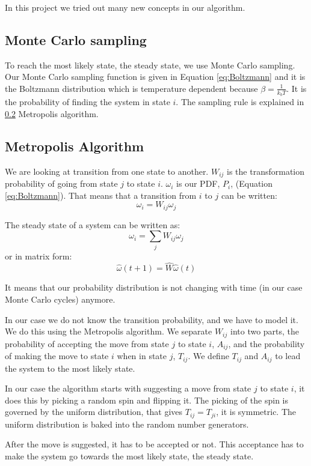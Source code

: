 In this project we tried out many new concepts in our algorithm.


\subsection{Monte Carlo sampling}

To reach the most likely state, the steady state, we use Monte Carlo sampling. Our Monte Carlo sampling function is given in Equation \ref{eq:Boltzmann} and it is the Boltzmann distribution which is temperature dependent because $\beta = \frac{1}{k_b T}$. It is the probability of finding the system in state $i$. The sampling rule is explained in \ref{sec:metropolis} Metropolis algorithm.

\subsection{Metropolis Algorithm}\label{sec:metropolis}

We are looking at transition from one state to another. $W_{ij}$ is the transformation probability of going from state $j$ to state $i$. $\omega_i$ is our PDF, $P_i$, (Equation \ref{eq:Boltzmann}). That means that a transition from $i$ to $j$ can be written:
\[
\omega_i = W_{ij}\omega_j
\]

The steady state of a system can be written as:
\[
\omega_i = \sum_j W_{ij}\omega_{j}
\]
or in matrix form:
\[
\hat{\omega}(t+1) = \hat{W}\hat{\omega}(t)
\]

It means that our probability distribution is not changing with time (in our case Monte Carlo cycles) anymore.

In our case we do not know the transition probability, and we have to model it. We do this using the Metropolis algorithm. We separate $W_{ij}$ into two parts, the probability of accepting the move from state $j$ to state $i$, $A_{ij}$, and the probability of making the move to state $i$ when in state $j$, $T_{ij}$. We define $T_{ij}$ and $A_{ij}$ to lead the system to the most likely state.

In our case the algorithm starts with suggesting a move from state $j$ to state $i$, it does this by picking a random spin and flipping it. The picking of the spin is governed by the uniform distribution, that gives $T_{ij }= T_{ji}$, it is symmetric. The uniform distribution is baked into the random number generators.

After the move is suggested, it has to be accepted or not. This acceptance has to make the system go towards the most likely state, the steady state.

